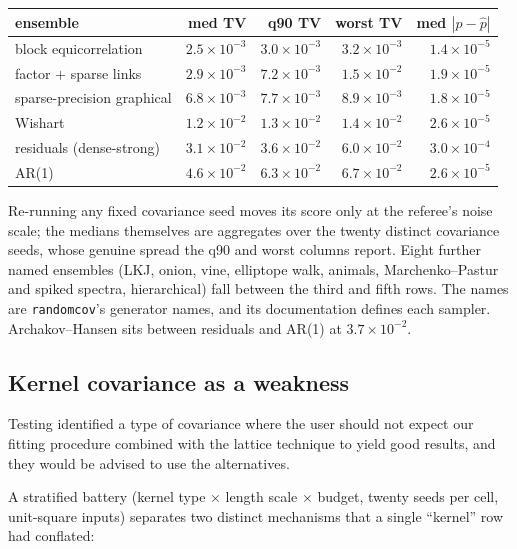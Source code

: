 \documentclass[11pt]{article}
\begin{document}
\begin{center}\small
\begin{tabular}{lrrrr}
\toprule
ensemble & med TV & q90 TV & worst TV & med $|p-\hat p|$\\
\midrule
block equicorrelation & $2.5\times10^{-3}$ & $3.0\times10^{-3}$ & $3.2\times10^{-3}$ & $1.4\times10^{-5}$\\
factor $+$ sparse links & $2.9\times10^{-3}$ & $7.2\times10^{-3}$ & $1.5\times10^{-2}$ & $1.9\times10^{-5}$\\
sparse-precision graphical & $6.8\times10^{-3}$ & $7.7\times10^{-3}$ & $8.9\times10^{-3}$ & $1.8\times10^{-5}$\\
Wishart & $1.2\times10^{-2}$ & $1.3\times10^{-2}$ & $1.4\times10^{-2}$ & $2.6\times10^{-5}$\\
residuals (dense-strong) & $3.1\times10^{-2}$ & $3.6\times10^{-2}$ & $6.0\times10^{-2}$ & $3.0\times10^{-4}$\\
AR(1) & $4.6\times10^{-2}$ & $6.3\times10^{-2}$ & $6.7\times10^{-2}$ & $2.6\times10^{-5}$\\
\bottomrule
\end{tabular}
\end{center}

Re-running any fixed covariance seed moves its score only at the
referee's noise scale; the medians themselves are aggregates over the
twenty distinct covariance seeds, whose genuine spread the q90 and worst
columns report. Eight further named
ensembles (LKJ, onion, vine, elliptope walk, animals, Marchenko--Pastur
and spiked spectra, hierarchical) fall between the third and fifth
rows. The names are \texttt{randomcov}'s generator names, and its
documentation defines each sampler. Archakov--Hansen sits between residuals and AR(1) at $3.7\times10^{-2}$.

\subsection{Kernel covariance as a weakness}

Testing identified a type of covariance where the user should not expect our fitting procedure combined with the lattice technique to yield good results, and they would be advised to use the alternatives.

A stratified battery
(kernel type $\times$ length scale $\times$ budget, twenty seeds per
cell, unit-square inputs) separates two distinct mechanisms that a
single ``kernel'' row had conflated:
\end{document}
